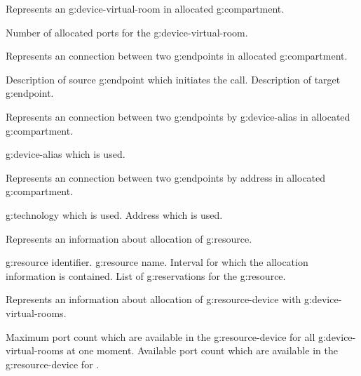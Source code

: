 \begin{Api}
Represents an \gls{g:device-virtual-room} in allocated \gls{g:compartment}.
\begin{ApiClassAttributes}
 Number of allocated ports for the \gls{g:device-virtual-room}.
\end{ApiClassAttributes}

Represents an connection between two \glspl{g:endpoint} in allocated \gls{g:compartment}.
\begin{ApiClassAttributes}
 Description of source \gls{g:endpoint} which initiates the call.
 Description of target \gls{g:endpoint}.
\end{ApiClassAttributes}

Represents an connection between two \glspl{g:endpoint} by \gls{g:device-alias} in allocated \gls{g:compartment}.
\begin{ApiClassAttributes}
 \Gls{g:device-alias} which is used.
\end{ApiClassAttributes}

Represents an connection between two \glspl{g:endpoint} by address in allocated \gls{g:compartment}.
\begin{ApiClassAttributes}
 \Gls{g:technology} which is used.
 Address which is used.
\end{ApiClassAttributes}

Represents an information about allocation of \gls{g:resource}.
\begin{ApiClassAttributes}
 \Gls{g:resource} identifier.
 \Gls{g:resource} name.
 Interval for which the allocation information is contained.
 List of \glspl{g:reservation} for the \gls{g:resource}.
\end{ApiClassAttributes}

Represents an information about allocation of \gls{g:resource-device} with \glspl{g:device-virtual-room}.
\begin{ApiClassAttributes}
 Maximum port count which are available in the \Gls{g:resource-device} for all \glspl{g:device-virtual-room} at one moment.
 Available port count which are available in the \Gls{g:resource-device} for .
\end{ApiClassAttributes}

\end{Api}

